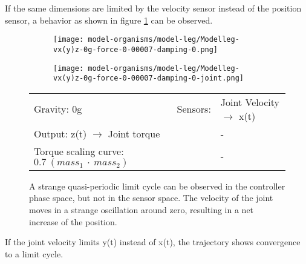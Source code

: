 \documentclass[main]{subfiles}
\begin{document}
If the same dimensions are limited by the velocity sensor instead of the position sensor, a behavior as shown in figure \ref{figure:limited-model-leg3} can be observed.

\begin{figure}[H]
	\centering
		\begin{subfigure}[c]{0.45\textwidth}
	\texttt{[image: model-organisms/model-leg/Modelleg-vx(y)z-0g-force-0-00007-damping-0.png]}
		\end{subfigure}
	\begin{subfigure}[c]{0.45\textwidth}
	\texttt{[image: model-organisms/model-leg/Modelleg-vx(y)z-0g-force-0-00007-damping-0-joint.png]}
		\end{subfigure}
	\caption[Joint Velocity \(\rightarrow\) x(t) limited chaotic controller controlling model leg]{A strange quasi-periodic limit cycle can be observed in the controller phase space, but not in the sensor space. The velocity of the joint moves in a strange oscillation around zero, resulting in a net increase of the position.}
	\begin{tabular}{l|ll}
	\hline 
	Gravity: 0g  & Sensors: & Joint Velocity \(\rightarrow\) x(t)\\
	 Output: z(t) \(\rightarrow\) Joint torque & & - \\
	  Torque scaling curve: \(0.7~(mass_1~\cdot~mass_2)\) & & - \\
	  \hline
	\end{tabular}
	\label{figure:limited-model-leg3}
\end{figure}

If the joint velocity limits y(t) instead of x(t), the trajectory shows convergence to a limit cycle.
\end{document}
